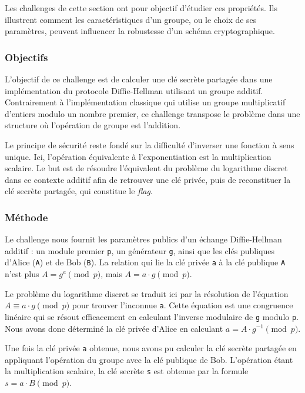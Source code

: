 \documentclass[12pt, a4paper]{article}
\begin{document}
    Les challenges de cette section ont pour objectif d'étudier ces
    propriétés. Ils illustrent comment les caractéristiques d'un groupe, ou le
    choix de ses paramètres, peuvent influencer la robustesse d'un schéma
    cryptographique.

    \subsubsection{Objectifs}
    L'objectif de ce challenge est de calculer une clé secrète partagée dans une
    implémentation du protocole Diffie-Hellman utilisant un groupe additif.
    Contrairement à l'implémentation classique qui utilise un groupe
    multiplicatif d'entiers modulo un nombre premier, ce challenge transpose le
    problème dans une structure où l'opération de groupe est l'addition.

    Le principe de sécurité reste fondé sur la difficulté d'inverser une
    fonction à sens unique. Ici, l'opération équivalente à l'exponentiation est
    la multiplication scalaire. Le but est de résoudre l'équivalent du problème
    du logarithme discret dans ce contexte additif afin de retrouver une clé
    privée, puis de reconstituer la clé secrète partagée, qui constitue le
    \textit{flag}.

    \subsubsection{Méthode}
    Le challenge nous fournit les paramètres publics d'un échange
    Diffie-Hellman additif : un module premier \texttt{p}, un générateur
    \texttt{g}, ainsi que les clés publiques d'Alice (\texttt{A}) et de Bob
    (\texttt{B}). La relation qui lie la clé privée \texttt{a} à la clé
    publique \texttt{A} n'est plus $A = g^a \pmod{p}$, mais
    $A = a \cdot g \pmod{p}$.

    Le problème du logarithme discret se traduit ici par la résolution de
    l'équation $A \equiv a \cdot g \pmod{p}$ pour trouver l'inconnue
    \texttt{a}. Cette équation est une congruence linéaire qui se résout
    efficacement en calculant l'inverse modulaire de \texttt{g} modulo
    \texttt{p}. Nous avons donc déterminé la clé privée d'Alice en calculant
    $a = A \cdot g^{-1} \pmod{p}$.

    Une fois la clé privée \texttt{a} obtenue, nous avons pu calculer la clé
    secrète partagée en appliquant l'opération du groupe avec la clé publique
    de Bob. L'opération étant la multiplication scalaire, la clé secrète
    \texttt{s} est obtenue par la formule $s = a \cdot B \pmod{p}$.
\end{document}
